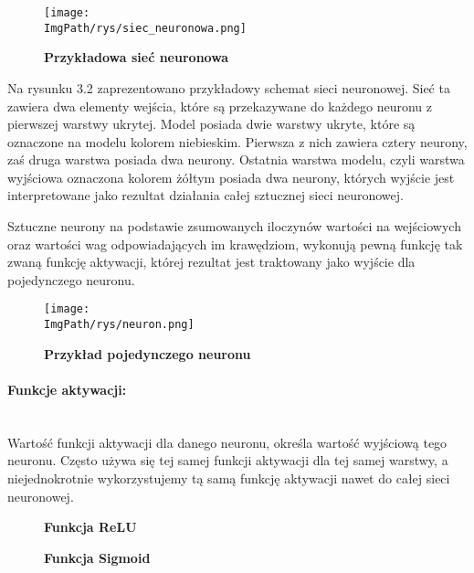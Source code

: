\documentclass[a4paper,12pt,twoside,openany]{report}
\newcommand{\ImgPath}{.}
\begin{document}
\begin{figure}[H]	
	\centering
	\texttt{[image: \\ImgPath/rys/siec\_neuronowa.png]}
	
	\caption{  \textbf{Przykładowa sieć neuronowa}}
\end{figure}

Na rysunku 3.2 zaprezentowano przykładowy schemat sieci neuronowej. Sieć ta zawiera dwa elementy wejścia, które są przekazywane do każdego neuronu z pierwszej warstwy ukrytej. Model posiada dwie warstwy ukryte, które są oznaczone na modelu kolorem niebieskim. Pierwsza z nich zawiera cztery neurony, zaś druga warstwa posiada dwa neurony. Ostatnia warstwa modelu, czyli warstwa wyjściowa oznaczona kolorem żółtym posiada dwa neurony, których wyjście jest interpretowane jako rezultat działania całej sztucznej sieci neuronowej.

Sztuczne neurony na podstawie zsumowanych iloczynów wartości na wejściowych oraz wartości wag odpowiadających im krawędziom, wykonują pewną funkcję tak zwaną funkcję aktywacji, której rezultat jest traktowany jako wyjście dla pojedynczego neuronu. 

\begin{figure}[H]	
	\centering
	\texttt{[image: \\ImgPath/rys/neuron.png]}
	
	\caption{  \textbf{Przykład pojedynczego neuronu}}
\end{figure}

\paragraph{Funkcje aktywacji:}
\mbox{} \\ \indent
Wartość funkcji aktywacji dla danego neuronu, określa wartość wyjściową tego neuronu. Często używa się tej samej funkcji aktywacji dla tej samej warstwy, a niejednokrotnie wykorzystujemy tą samą funkcję aktywacji nawet do całej sieci neuronowej. 

\begin{figure}[H]
	\centering
		\caption{  \textbf{Funkcja ReLU}}
\end{figure}

\begin{figure}[H]
	\centering
	\caption{  \textbf{Funkcja Sigmoid}}
\end{figure}
\end{document}
